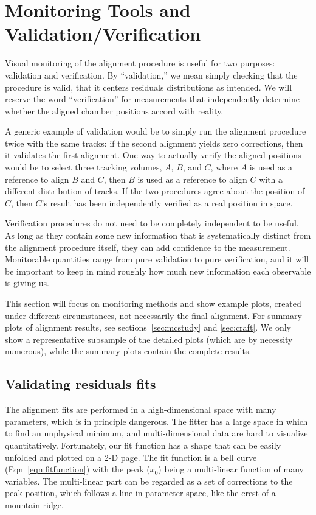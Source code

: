 \documentclass[12pt]{article}
\begin{document}
\section{Monitoring Tools and Validation/Verification}

Visual monitoring of the alignment procedure is useful for two
purposes: validation and verification.  By ``validation,'' we mean
simply checking that the procedure is valid, that it centers residuals
distributions as intended.  We will reserve the word ``verification''
for measurements that independently determine whether the aligned
chamber positions accord with reality.

A generic example of validation would be to simply run the alignment
procedure twice with the same tracks: if the second alignment yields
zero corrections, then it validates the first alignment.  One way to
actually verify the aligned positions would be to select three
tracking volumes, $A$, $B$, and $C$, where $A$ is used as a reference
to align $B$ and $C$, then $B$ is used as a reference to align $C$
with a different distribution of tracks.  If the two procedures agree
about the position of $C$, then $C$'s result has been independently
verified as a real position in space.

Verification procedures do not need to be completely independent to be
useful.  As long as they contain some new information that is
systematically distinct from the alignment procedure itself, they can
add confidence to the measurement.  Monitorable quantities range from
pure validation to pure verification, and it will be important to keep
in mind roughly how much new information each observable is giving us.

This section will focus on monitoring methods and show example plots,
created under different circumstances, not necessarily the final
alignment.  For summary plots of alignment results, see
sections~\ref{sec:mcstudy} and \ref{sec:craft}.  We only show a
representative subsample of the detailed plots (which are by necessity
numerous), while the summary plots contain the complete results.

\subsection{Validating residuals fits}
\label{sec:validating_residuals_fits}

The alignment fits are performed in a high-dimensional space with many
parameters, which is in principle dangerous.  The fitter has a large
space in which to find an unphysical minimum, and multi-dimensional
data are hard to visualize quantitatively.  Fortunately, our fit
function has a shape that can be easily unfolded and plotted on a 2-D
page.  The fit function is a bell curve (Eqn~\ref{eqn:fitfunction})
with the peak ($x_0$) being a multi-linear function of many variables.
The multi-linear part can be regarded as a set of corrections to the
peak position, which follows a line in parameter space, like the crest
of a mountain ridge.
\end{document}
